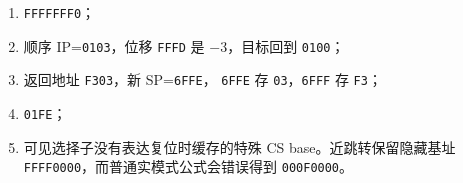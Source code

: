 \begin{answerbox}
\begin{enumerate}[leftmargin=2.2em]
  \item \texttt{FFFFFFF0}；
  \item 顺序 IP=\texttt{0103}，位移 \texttt{FFFD} 是 \(-3\)，目标回到
    \texttt{0100}；
  \item 返回地址 \texttt{F303}，新 SP=\texttt{6FFE}，
    \texttt{6FFE} 存 \texttt{03}，\texttt{6FFF} 存 \texttt{F3}；
  \item \texttt{01FE}；
  \item 可见选择子没有表达复位时缓存的特殊 CS base。近跳转保留隐藏基址
    \texttt{FFFF0000}，而普通实模式公式会错误得到 \texttt{000F0000}。
\end{enumerate}
\end{answerbox}
